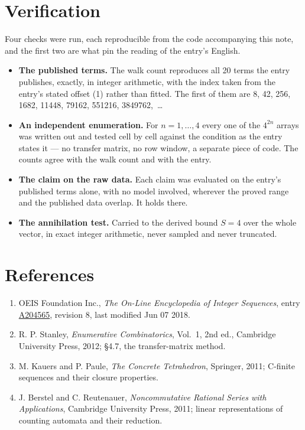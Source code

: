 \documentclass[11pt]{article}
\theoremstyle{definition}
\begin{document}
\section{Verification}

Four checks were run, each reproducible from the code accompanying this note, and the first two are what pin the reading of the entry's English.

\begin{itemize}

\item {\bfseries The published terms.} The walk count reproduces all 20 terms the entry publishes, exactly, in integer arithmetic, with the index taken from the entry's stated offset (1) rather than fitted. The first of them are 8, 42, 256, 1682, 11448, 79162, 551216, 3849762,~\dots

\item {\bfseries An independent enumeration.} For $n = 1,\dots,4$ every one of the $4^{2n}$ arrays was written out and tested cell by cell against the condition as the entry states it --- no transfer matrix, no row window, a separate piece of code. The counts agree with the walk count and with the entry.

\item {\bfseries The claim on the raw data.} Each claim was evaluated on the entry's published terms alone, with no model involved, wherever the proved range and the published data overlap. It holds there.

\item {\bfseries The annihilation test.} Carried to the derived bound $S = 4$ over the whole vector, in exact integer arithmetic, never sampled and never truncated.

\end{itemize}

\section{References}

\begin{enumerate}

\item OEIS Foundation Inc., \emph{The On-Line Encyclopedia of Integer Sequences}, entry \href{https://oeis.org/A204565}{A204565}, revision 8, last modified Jun 07 2018.

\item R. P. Stanley, \emph{Enumerative Combinatorics}, Vol.~1, 2nd ed., Cambridge University Press, 2012; \S4.7, the transfer-matrix method.

\item M. Kauers and P. Paule, \emph{The Concrete Tetrahedron}, Springer, 2011; C-finite sequences and their closure properties.

\item J. Berstel and C. Reutenauer, \emph{Noncommutative Rational Series with Applications}, Cambridge University Press, 2011; linear representations of counting automata and their reduction.

\end{enumerate}
\end{document}
